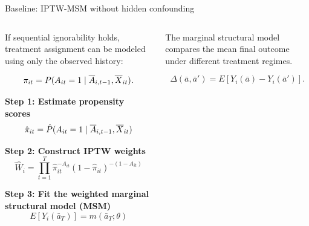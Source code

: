 \documentclass[aspectratio=169,12pt]{beamer}
\newcommand{\muted}[1]{\textcolor{PrimerMuted}{#1}}
\newcommand{\pstrong}[1]{{\bfseries #1}}
\newcommand{\arrowtext}[1]{\par\vspace{0.45em}\noindent{\fontsize{10}{12}\selectfont $\to$}\hspace{0.45em}{#1}\par}
\newcommand{\spacedparagraph}[1]{\par\noindent\begin{minipage}{0.96\linewidth}\RaggedRight #1\end{minipage}\par\vspace{0.55em}}
\newcommand{\smallref}[1]{\vspace{0.15cm}{\fontsize{5.8}{7}\selectfont\muted{#1}}}
\newcommand{\hist}[1]{\overline{\vphantom{X}#1}}
\begin{document}
\begin{frame}{Baseline: IPTW-MSM without hidden confounding}
\begin{columns}[T,onlytextwidth]

\begin{column}{0.46\textwidth}
{\fontsize{9.1}{11}\selectfont
\spacedparagraph{If sequential ignorability holds, treatment assignment can be modeled using only the observed history:}

\vspace{-0.20cm}
\[
\pi_{it} = P(A_{it}=1\mid \hist{A}_{i,t-1},\hist{X}_{it}).
\]

\pstrong{Step 1: Estimate propensity scores}
\[
\hat\pi_{it} =
\hat P(A_{it}=1\mid \hist{A}_{i,t-1},\hist{X}_{it})
\]

\vspace{-0.25cm}
\pstrong{Step 2: Construct IPTW weights}
\[
\widehat W_i = 
\prod_{t=1}^{T}
\hat\pi_{it}^{-A_{it}}
(1-\hat\pi_{it})^{-(1-A_{it})}
\] 

\pstrong{Step 3: Fit the weighted marginal structural model (MSM)}
\[
E[Y_i(\bar a_T)]=m(\bar a_T;\theta)
\]

\vspace{-0.25cm}
}
\end{column}

\begin{column}{0.50\textwidth}
{\fontsize{9.1}{11}\selectfont

\spacedparagraph{
The marginal structural model compares the mean final outcome under different treatment regimes.
}

\vspace{0.15cm}

\[
\Delta(\bar a,\bar a')
=
E\!\left[
Y_i(\bar a)-Y_i(\bar a')
\right].
\]

\arrowtext{The parameters ($\theta$) are interpreted causally only if 
the propensity model captures all treatment-outcome confounding and is correctly specified.}
}
\end{column}

\end{columns}
\end{frame}
\end{document}
